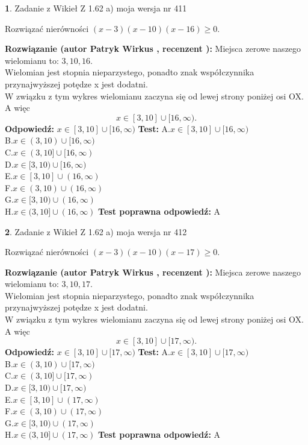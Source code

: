 \documentclass[12pt, a4paper]{article}
\theoremstyle{definition} %
\newtheorem{zad}{}
\newcommand{\zadStart}[1]{\begin{zad}#1\newline}
\newcommand{\zadStop}{\end{zad}}
\newcommand{\rozwStart}[2]{\noindent \textbf{Rozwiązanie (autor #1 , recenzent #2): }\newline}
\newcommand{\rozwStop}{\newline}
\newcommand{\odpStart}{\noindent \textbf{Odpowiedź:}\newline}
\newcommand{\odpStop}{\newline}
\newcommand{\testStart}{\noindent \textbf{Test:}\newline}
\newcommand{\testStop}{\newline}
\newcommand{\kluczStart}{\noindent \textbf{Test poprawna odpowiedź:}\newline}
\newcommand{\kluczStop}{\newline}
\begin{document}
\zadStart{Zadanie z Wikieł Z 1.62 a) moja wersja nr 411}

Rozwiązać nierówności $(x-3)(x-10)(x-16)\ge0$.
\zadStop
\rozwStart{Patryk Wirkus}{}
Miejsca zerowe naszego wielomianu to: $3, 10, 16$.\\
Wielomian jest stopnia nieparzystego, ponadto znak współczynnika przy\linebreak najwyższej potędze x jest dodatni.\\ W związku z tym wykres wielomianu zaczyna się od lewej strony poniżej osi OX. A więc $$x \in [3,10] \cup [16,\infty).$$
\rozwStop
\odpStart
$x \in [3,10] \cup [16,\infty)$
\odpStop
\testStart
A.$x \in [3,10] \cup [16,\infty)$\\
B.$x \in (3,10) \cup [16,\infty)$\\
C.$x \in (3,10] \cup [16,\infty)$\\
D.$x \in [3,10) \cup [16,\infty)$\\
E.$x \in [3,10] \cup (16,\infty)$\\
F.$x \in (3,10) \cup (16,\infty)$\\
G.$x \in [3,10) \cup (16,\infty)$\\
H.$x \in (3,10] \cup (16,\infty)$
\testStop
\kluczStart
A
\kluczStop



\zadStart{Zadanie z Wikieł Z 1.62 a) moja wersja nr 412}

Rozwiązać nierówności $(x-3)(x-10)(x-17)\ge0$.
\zadStop
\rozwStart{Patryk Wirkus}{}
Miejsca zerowe naszego wielomianu to: $3, 10, 17$.\\
Wielomian jest stopnia nieparzystego, ponadto znak współczynnika przy\linebreak najwyższej potędze x jest dodatni.\\ W związku z tym wykres wielomianu zaczyna się od lewej strony poniżej osi OX. A więc $$x \in [3,10] \cup [17,\infty).$$
\rozwStop
\odpStart
$x \in [3,10] \cup [17,\infty)$
\odpStop
\testStart
A.$x \in [3,10] \cup [17,\infty)$\\
B.$x \in (3,10) \cup [17,\infty)$\\
C.$x \in (3,10] \cup [17,\infty)$\\
D.$x \in [3,10) \cup [17,\infty)$\\
E.$x \in [3,10] \cup (17,\infty)$\\
F.$x \in (3,10) \cup (17,\infty)$\\
G.$x \in [3,10) \cup (17,\infty)$\\
H.$x \in (3,10] \cup (17,\infty)$
\testStop
\kluczStart
A
\kluczStop
\end{document}
